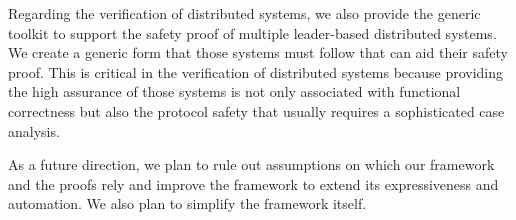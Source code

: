 Regarding the verification of distributed systems, we also provide the generic toolkit to support the safety proof of multiple 
leader-based distributed systems. We create a generic form that those systems must follow that can aid their safety proof. 
This is critical in the verification of distributed systems because providing the high assurance of those systems is not only associated with 
functional correctness but also the protocol safety that usually requires a sophisticated case analysis.

As a future direction, we plan to rule out assumptions on which our framework and the proofs rely and improve the framework to
extend its expressiveness and automation. We also plan to simplify the framework itself.